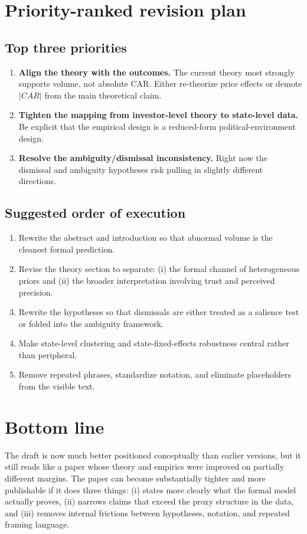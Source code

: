 \documentclass[12pt]{article}
\begin{document}
\section*{Priority-ranked revision plan}

\subsection*{Top three priorities}
\begin{enumerate}[label=\textbf{\arabic*.}, leftmargin=1.75em]
    \item \textbf{Align the theory with the outcomes.} The current theory most strongly supports volume, not absolute CAR. Either re-theorize price effects or demote \(|CAR|\) from the main theoretical claim.
    \item \textbf{Tighten the mapping from investor-level theory to state-level data.} Be explicit that the empirical design is a reduced-form political-environment design.
    \item \textbf{Resolve the ambiguity/dismissal inconsistency.} Right now the dismissal and ambiguity hypotheses risk pulling in slightly different directions.
\end{enumerate}

\subsection*{Suggested order of execution}
\begin{enumerate}[label=\textbf{Step \arabic*:}, leftmargin=1.9em]
    \item Rewrite the abstract and introduction so that abnormal volume is the cleanest formal prediction.
    \item Revise the theory section to separate: (i) the formal channel of heterogeneous priors and (ii) the broader interpretation involving trust and perceived precision.
    \item Rewrite the hypotheses so that dismissals are either treated as a salience test or folded into the ambiguity framework.
    \item Make state-level clustering and state-fixed-effects robustness central rather than peripheral.
    \item Remove repeated phrases, standardize notation, and eliminate placeholders from the visible text.
\end{enumerate}

\section*{Bottom line}
The draft is now much better positioned conceptually than earlier versions, but it still reads like a paper whose theory and empirics were improved on partially different margins. The paper can become substantially tighter and more publishable if it does three things: (i) states more clearly what the formal model actually proves, (ii) narrows claims that exceed the proxy structure in the data, and (iii) removes internal frictions between hypotheses, notation, and repeated framing language.
\end{document}
